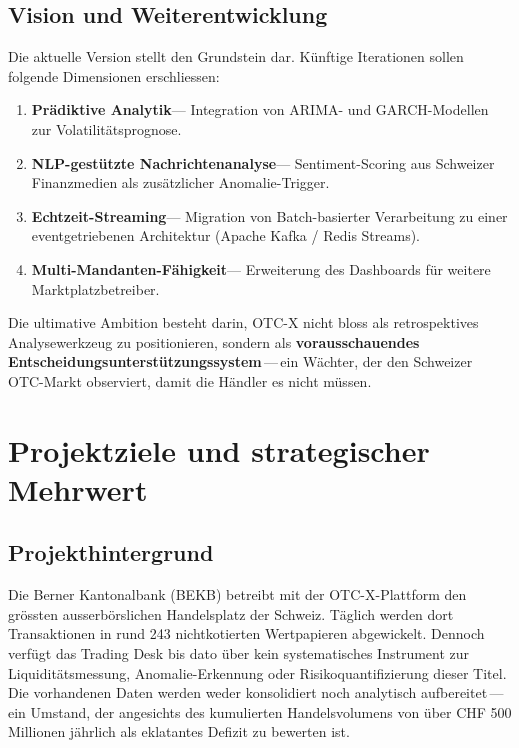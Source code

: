 \documentclass[12pt, a4paper, oneside]{report}
\begin{document}
\section{Vision und Weiterentwicklung}

Die aktuelle Version stellt den Grundstein dar. K\"unftige Iterationen sollen folgende Dimensionen erschliessen:

\begin{enumerate}
  \item \textbf{Pr\"adiktive Analytik}\;--- Integration von ARIMA- und GARCH-Modellen zur Volatilit\"atsprognose.
  \item \textbf{NLP-gest\"utzte Nachrichtenanalyse}\;--- Sentiment-Scoring aus Schweizer Finanzmedien als zus\"atzlicher Anomalie-Trigger.
  \item \textbf{Echtzeit-Streaming}\;--- Migration von Batch-basierter Verarbeitung zu einer eventgetriebenen Architektur (Apache Kafka / Redis Streams).
  \item \textbf{Multi-Mandanten-F\"ahigkeit}\;--- Erweiterung des Dashboards f\"ur weitere Marktplatzbetreiber.
\end{enumerate}

\begin{insightbox}
Die ultimative Ambition besteht darin, OTC-X nicht bloss als retrospektives Analysewerkzeug zu positionieren, sondern als \textbf{vorausschauendes Entscheidungsunterst\"utzungssystem}\,---\,ein W\"achter, der den Schweizer OTC-Markt observiert, damit die H\"andler es nicht m\"ussen.
\end{insightbox}


\chapter{Projektziele und strategischer Mehrwert}
\label{ch:projektziele}

\section{Projekthintergrund}

Die Berner Kantonalbank (BEKB) betreibt mit der OTC-X-Plattform den gr\"ossten ausserb\"orslichen Handelsplatz der Schweiz. T\"aglich werden dort Transaktionen in rund 243 nichtkotierten Wertpapieren abgewickelt. Dennoch verf\"ugt das Trading Desk bis dato \"uber kein systematisches Instrument zur Liquidit\"atsmessung, Anomalie-Erkennung oder Risikoquantifizierung dieser Titel. Die vorhandenen Daten werden weder konsolidiert noch analytisch aufbereitet\,---\,ein Umstand, der angesichts des kumulierten Handelsvolumens von \"uber CHF 500 Millionen j\"ahrlich als eklatantes Defizit zu bewerten ist.
\end{document}
